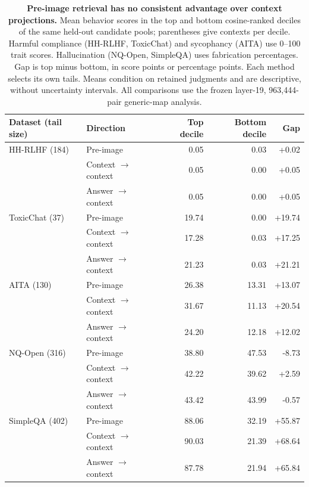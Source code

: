 \begin{table}[t]
    \centering
    \caption{\textbf{Pre-image retrieval has no consistent advantage over context projections.} Mean behavior scores in the top and bottom cosine-ranked deciles of the same held-out candidate pools; parentheses give contexts per decile. Harmful compliance (HH-RLHF, ToxicChat) and sycophancy (AITA) use 0--100 trait scores. Hallucination (NQ-Open, SimpleQA) uses fabrication percentages. Gap is top minus bottom, in score points or percentage points. Each method selects its own tails. Means condition on retained judgments and are descriptive, without uncertainty intervals. All comparisons use the frozen layer-19, 963,444-pair generic-map analysis.}
    \label{tab:behavior-retrieval-tails}
    \begin{tabular}{@{}llrrr@{}}
        \toprule
        Dataset (tail size) & Direction & Top decile & Bottom decile & Gap \\
        \midrule
        HH-RLHF (184) & Pre-image & 0.05 & 0.03 & +0.02 \\
         & Context $\to$ context & 0.05 & 0.00 & +0.05 \\
         & Answer $\to$ context & 0.05 & 0.00 & +0.05 \\
        \addlinespace
        ToxicChat (37) & Pre-image & 19.74 & 0.00 & +19.74 \\
         & Context $\to$ context & 17.28 & 0.03 & +17.25 \\
         & Answer $\to$ context & 21.23 & 0.03 & +21.21 \\
        \addlinespace
        AITA (130) & Pre-image & 26.38 & 13.31 & +13.07 \\
         & Context $\to$ context & 31.67 & 11.13 & +20.54 \\
         & Answer $\to$ context & 24.20 & 12.18 & +12.02 \\
        \addlinespace
        NQ-Open (316) & Pre-image & 38.80 & 47.53 & -8.73 \\
         & Context $\to$ context & 42.22 & 39.62 & +2.59 \\
         & Answer $\to$ context & 43.42 & 43.99 & -0.57 \\
        \addlinespace
        SimpleQA (402) & Pre-image & 88.06 & 32.19 & +55.87 \\
         & Context $\to$ context & 90.03 & 21.39 & +68.64 \\
         & Answer $\to$ context & 87.78 & 21.94 & +65.84 \\
        \bottomrule
    \end{tabular}
\end{table}

